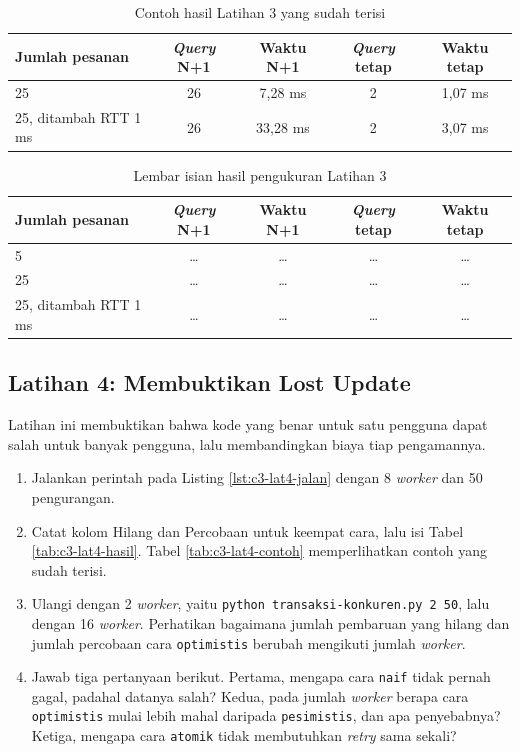 \begin{table}[!htb]
  \centering
  \caption{Contoh hasil Latihan 3 yang sudah terisi}
  \label{tab:c3-lat3-contoh}
  \begin{tabularx}{\textwidth}{Xcccc}
    \hline
    \textbf{Jumlah pesanan} & \textbf{\textit{Query} N+1} & \textbf{Waktu N+1} & \textbf{\textit{Query} tetap} & \textbf{Waktu tetap} \\
    \hline
    25 & 26 & 7,28 ms & 2 & 1,07 ms \\
    \hline
    25, ditambah RTT 1 ms & 26 & 33,28 ms & 2 & 3,07 ms \\
    \hline
  \end{tabularx}
\end{table}

\begin{table}[!htb]
  \centering
  \caption{Lembar isian hasil pengukuran Latihan 3}
  \label{tab:c3-lat3-hasil}
  \begin{tabularx}{\textwidth}{Xcccc}
    \hline
    \textbf{Jumlah pesanan} & \textbf{\textit{Query} N+1} & \textbf{Waktu N+1} & \textbf{\textit{Query} tetap} & \textbf{Waktu tetap} \\
    \hline
    5 & \dots & \dots & \dots & \dots \\
    \hline
    25 & \dots & \dots & \dots & \dots \\
    \hline
    25, ditambah RTT 1 ms & \dots & \dots & \dots & \dots \\
    \hline
  \end{tabularx}
\end{table}

\subsection*{Latihan 4: Membuktikan Lost Update}

Latihan ini membuktikan bahwa kode yang benar untuk satu pengguna dapat salah
untuk banyak pengguna, lalu membandingkan biaya tiap pengamannya.

\begin{enumerate}
  \item Jalankan perintah pada Listing \ref{lst:c3-lat4-jalan} dengan 8 \textit{worker}
        dan 50 pengurangan.
  \item Catat kolom Hilang dan Percobaan untuk keempat cara, lalu isi Tabel \ref{tab:c3-lat4-hasil}.
        Tabel \ref{tab:c3-lat4-contoh} memperlihatkan contoh yang sudah terisi.
  \item Ulangi dengan 2 \textit{worker}, yaitu
        \texttt{python transaksi-konkuren.py 2 50}, lalu dengan 16
        \textit{worker}. Perhatikan bagaimana
        jumlah pembaruan yang hilang dan jumlah percobaan cara
        \texttt{optimistis} berubah mengikuti jumlah \textit{worker}.
  \item Jawab tiga pertanyaan berikut. Pertama, mengapa cara \texttt{naif} tidak
        pernah gagal, padahal datanya salah? Kedua, pada jumlah \textit{worker} berapa
        cara \texttt{optimistis} mulai lebih mahal daripada
        \texttt{pesimistis}, dan apa penyebabnya? Ketiga, mengapa cara
        \texttt{atomik} tidak membutuhkan \textit{retry} sama sekali?
\end{enumerate}

